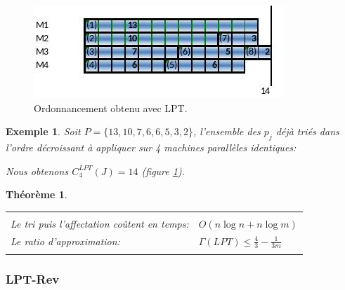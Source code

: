 \documentclass[a4paper,12pt]{report}
\theoremstyle{plain}				%
\newtheorem{theoreme}{Théorème}	%
\newtheorem{example}{Exemple}
\theoremstyle{definition}				%
\newcommand{\tdi}[1]{\todo[inline]{{#1}}{}}
\newcommand{\lcc}[1]{\todo[author=LCC,color=green,inline]{#1}}
\begin{document}
\bigskip

\begin{figure}
{\centering
\includegraphics[width=\columnwidth]{Biblio_PCmax_Rendu_exLPT1.jpg}
\caption{Ordonnancement obtenu avec LPT.}
\label{ex:LPTExempleAlgo}
\par}
\end{figure}

\begin{example}
Soit $P=\{13,10,7,6,6,5,3,2\}$, l'ensemble des $p_j$ déjà triés dans
l'ordre décroissant à appliquer sur 4 machines parallèles identiques:

Nous obtenons $C_4^{LPT}(J)=14$ (figure \ref{ex:LPTExempleAlgo}).
\end{example}

\begin{theoreme}
\begin{flushleft}
\begin{tabular}{|p{8cm}p{6cm}|}
\hline
& \\
Le tri puis l'affectation coûtent en temps:& $O(n \log n + n \log m)$
\\	%
Le ratio d'approximation:	&	$\Gamma(LPT)\leq \frac{4}{3} - \frac{1}{3m}$
\\
& \\
\hline
\end{tabular}
\end{flushleft}
\end{theoreme}


\subsubsection{LPT-Rev} %
\end{document}
